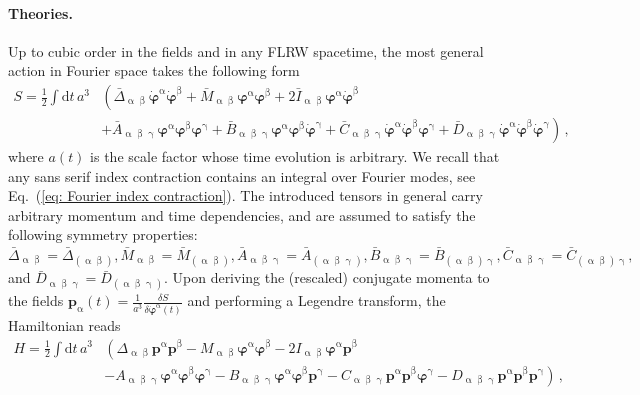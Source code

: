 \documentclass[11pt]{article}
\numberwithin{equation}{section} %
\begin{document}
\paragraph{Theories.} Up to cubic order in the fields and in any FLRW spacetime, the most general action in Fourier space takes the following form
\begin{equation}
\begin{aligned}
    S = \frac{1}{2} \int \mathrm{d}t\, a^3 &\left(\bar{\Delta}_{\upalpha\upbeta}\dot{\bm{\varphi}}^{\upalpha}\dot{\bm{\varphi}}^{\upbeta} + \bar{M}_{\upalpha\upbeta}\bm{\varphi}^{\upalpha}\bm{\varphi}^{\upbeta} + 2\bar{I}_{\upalpha\upbeta}\bm{\varphi}^{\upalpha}\dot{\bm{\varphi}}^{\upbeta} \right.\\
    &\left. + \bar{A}_{\upalpha\upbeta\upgamma}\bm{\varphi}^{\upalpha}\bm{\varphi}^{\upbeta}\bm{\varphi}^{\upgamma} + \bar{B}_{\upalpha\upbeta\upgamma}\bm{\varphi}^{\upalpha}\bm{\varphi}^{\upbeta}\dot{\bm{\varphi}}^{\upgamma} + \bar{C}_{\upalpha\upbeta\upgamma}\dot{\bm{\varphi}}^{\upalpha}\dot{\bm{\varphi}}^{\upbeta}\bm{\varphi}^{\upgamma} + \bar{D}_{\upalpha\upbeta\upgamma}\dot{\bm{\varphi}}^{\upalpha}\dot{\bm{\varphi}}^{\upbeta}\dot{\bm{\varphi}}^{\upgamma}  \right)\,,
\end{aligned}
\end{equation}
where $a(t)$ is the scale factor whose time evolution is arbitrary. We recall that any \textsf{sans serif} index contraction contains an integral over Fourier modes, see Eq.~(\ref{eq: Fourier index contraction}). The introduced tensors in general carry arbitrary
momentum and time dependencies, and are assumed to satisfy the following symmetry properties: $\bar{\Delta}_{\upalpha\upbeta} = \bar{\Delta}_{(\upalpha\upbeta)}, \bar{M}_{\upalpha\upbeta} = \bar{M}_{(\upalpha\upbeta)}, \bar{A}_{\upalpha\upbeta\upgamma} = \bar{A}_{(\upalpha\upbeta\upgamma)}, \bar{B}_{\upalpha\upbeta\upgamma} = \bar{B}_{(\upalpha\upbeta)\upgamma}, \bar{C}_{\upalpha\upbeta\upgamma} = \bar{C}_{(\upalpha\upbeta)\upgamma} ,$ and $\bar{D}_{\upalpha\upbeta\upgamma} = \bar{D}_{(\upalpha\upbeta\upgamma)}$. Upon deriving the (rescaled) conjugate momenta to the fields $\bm{p}_{\upalpha}(t) = \tfrac{1}{a^3}\tfrac{\delta S}{\delta \dot{\bm{\varphi}}^{\upalpha}(t)}$ and performing a Legendre transform, the Hamiltonian reads
\begin{equation}
\label{eq: Hamiltonian}
\begin{aligned}
    H = \frac{1}{2}\int \mathrm{d}t\, a^3 &\left( \Delta_{\upalpha\upbeta} \bm{p}^{\upalpha}\bm{p}^{\upbeta} - M_{\upalpha\upbeta}\bm{\varphi}^\upalpha\bm{\varphi}^\upbeta - 2I_{\upalpha\upbeta}\bm{\varphi}^{\upalpha}\bm{p}^{\upbeta} \right.\\
    &\left. - A_{\upalpha\upbeta\upgamma}\bm{\varphi}^{\upalpha}\bm{\varphi}^{\upbeta}\bm{\varphi}^{\upgamma} - B_{\upalpha\upbeta\upgamma}\bm{\varphi}^{\upalpha}\bm{\varphi}^{\upbeta}\bm{p}^{\upgamma} - C_{\upalpha\upbeta\upgamma}\bm{p}^{\upalpha}\bm{p}^{\upbeta}\bm{\varphi}^{\upgamma} - D_{\upalpha\upbeta\upgamma}\bm{p}^{\upalpha}\bm{p}^{\upbeta}\bm{p}^{\upgamma}  \right)\,,
\end{aligned}
\end{equation}
\end{document}
